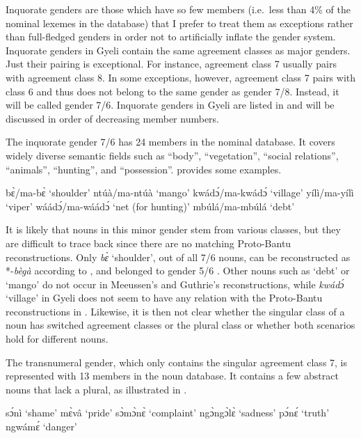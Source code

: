 Inquorate genders are those which have so few members (i.e.\ less than 4\% of the nominal lexemes in the database) that I prefer to treat them as exceptions rather than full-fledged genders in order not to artificially inflate the gender system. Inquorate genders in Gyeli contain the same  agreement classes as major genders. Just their pairing is exceptional. For instance, agreement class 7 usually pairs with agreement class 8. In some exceptions, however, agreement class 7 pairs with class 6 and thus does not belong to the same gender as gender 7/8. Instead, it will be called gender 7/6. Inquorate genders in Gyeli are listed in   and will be discussed in order of decreasing member numbers.

The inquorate gender 7/6 has 24 members in the nominal database. It covers widely diverse semantic fields such as ``body'', ``vegetation'', ``social relations'', ``animals'', ``hunting'', and ``possession''.  provides some examples.


\ea\label{7/6}
\ea bɛ̀/ma-bɛ̀ `shoulder'
\ex ntúà/ma-ntúà `mango'
\ex kwádɔ́/ma-kwádɔ́ `village'
\ex yílì/ma-yílì `viper'
\ex wáádɔ́/ma-wáádɔ́ `net (for hunting)'
\ex mbúlá/ma-mbúlá `debt'
\z
\z

\noindent It is likely that nouns in this minor gender stem from various classes, but they are difficult to trace back since there are no matching Proto-Bantu reconstructions. Only  {\itshape bɛ̀} `shoulder', out of all 7/6 nouns, can be reconstructed as *-{\itshape bègà} according to \citet[154]{guthrie67}, and belonged to gender 5/6 \citep[101]{meeussen67}.
Other nouns such as `debt' or `mango' do not occur in Meeussen's and Guthrie's reconstructions, while  {\itshape kwádɔ́} `village' in Gyeli does not seem to have any relation with the Proto-Bantu reconstructions in \citet[27]{guthrie71}. Likewise, it is then not clear whether the singular class of a noun has switched agreement classes or the plural class or whether both scenarios hold for different nouns. 

The transnumeral gender, which only contains the singular agreement class 7, is represented with 13 members in the noun database. It contains a few abstract nouns that lack a plural, as illustrated in .

\ea\label{7/0a}
\ea sɔ́nì `shame'
\ex mɛ̀vâ `pride'
\ex sɔ̀mɔ̀nɛ̀ `complaint'
\ex ngɔ̀ngɔ̀lɛ̀ `sadness'
\ex pɔ́nɛ́ `truth'
\ex ngwámɛ́ `danger'
\z
\z

